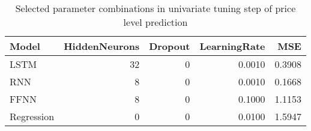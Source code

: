 \begin{table}[h!]
\centering
 \begin{adjustbox}{max width=\textwidth}
\begin{tabular}{lrrrr}
  \hline
Model & HiddenNeurons & Dropout & LearningRate & MSE \\ 
  \hline
LSTM &    32 &     0 & 0.0010 & 0.3908 \\ 
  RNN &     8 &     0 & 0.0010 & 0.1668 \\ 
  FFNN &     8 &     0 & 0.1000 & 1.1153 \\ 
  Regression &     0 &     0 & 0.0100 & 1.5947 \\ 
   \hline
 \end{tabular}
\end{adjustbox}
\caption{Selected parameter combinations in univariate tuning step of price level prediction} 
\label{tab:level.par.tuning.short}
\end{table}

